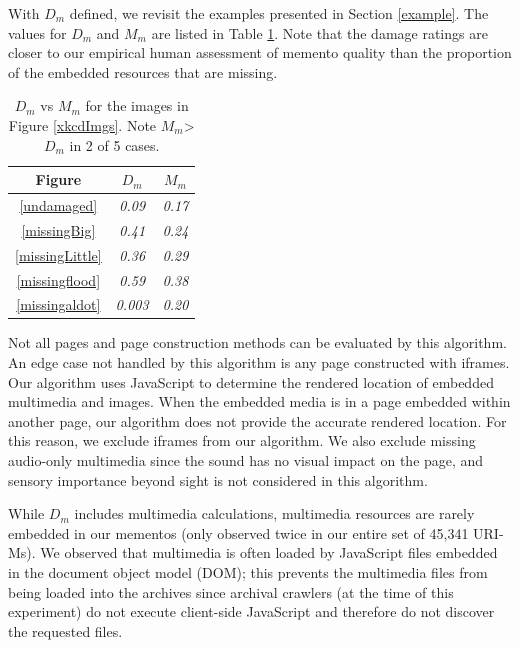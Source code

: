 With $D_m$ defined, we revisit the examples presented in Section \ref{example}. The values for $D_m$ and $M_m$ are listed in Table \ref{damageTable}. Note that the damage ratings are closer to our empirical human assessment of memento quality than the proportion of the embedded resources that are missing.

\begin{table}
\centering
\begin{tabular}{ c | c | c }
    \hline
    Figure & $D_m$ & $M_m$\\
    \hline
    \hline
\ref{undamaged} & \emph{0.09} & \emph{0.17}\\
\ref{missingBig} & \emph{0.41} & \emph{0.24}\\
\ref{missingLittle} & \emph{0.36} & \emph{0.29}\\
\ref{missingflood} & \emph{0.59} & \emph{0.38}\\
\ref{missingaldot} & \emph{0.003} & \emph{0.20}\\
    \hline
\end{tabular}
  \caption{$D_m$ vs $M_m$ for the images in Figure \ref{xkcdImgs}. Note $M_m$>$D_m$ in 2 of 5 cases.}
  \label{damageTable}
\end{table}

Not all pages and page construction methods can be evaluated by this algorithm. An edge case not handled by this algorithm is any page constructed with iframes. Our algorithm uses JavaScript to determine the rendered location of embedded multimedia and images. When the embedded media is in a page embedded within another page, our algorithm does not provide the accurate rendered location. For this reason, we exclude iframes from our algorithm. We also exclude missing audio-only multimedia since the sound has no visual impact on the page, and sensory importance beyond sight is not considered in this algorithm.

While $D_m$ includes multimedia calculations, multimedia resources are rarely embedded in our mementos (only observed twice in our entire set of 45,341 URI-Ms). We observed that multimedia is often loaded by JavaScript files embedded in the document object model (DOM); this prevents the multimedia files from being loaded into the archives since archival crawlers (at the time of this experiment) do not execute client-side JavaScript and therefore do not discover the requested files.%
\\
\\
